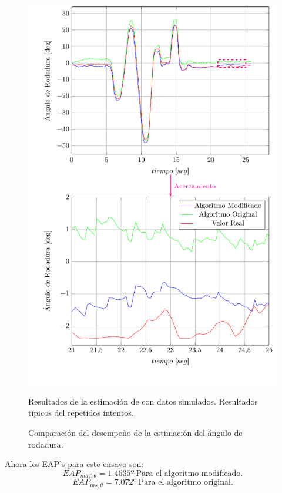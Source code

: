 \documentclass[10pt]{report}
\numberwithin{equation}{chapter}
\numberwithin{algorithm}{chapter}
\begin{document}
\begin{figure}
\begin{center}
\includegraphics[scale=0.8]
{PlotTh27.pdf}
\caption{Comparación del desempeño de la estimación del ángulo de rodadura.}
\scriptsize{Resultados de la estimación de con datos simulados. Resultados típicos del repetidos intentos.}
\label{PlotTh1}
\end{center}
\end{figure}
Ahora los EAP's para este ensayo son:
\begin{equation*}
EAP_{mdf,\theta}=1.4635º~\text{Para el algoritmo modificado.}
\end{equation*}
\begin{equation*}
EAP_{ms,\theta}=7.072º~\text{Para el algoritmo original.}
\end{equation*}
\end{document}
